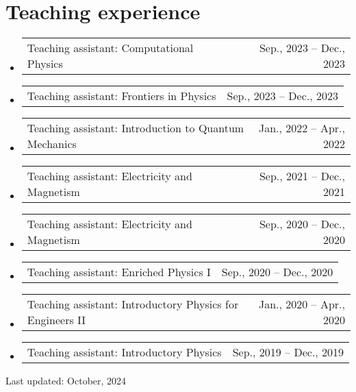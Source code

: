 \documentclass[letterpaper,11pt]{article}
\makeatletter
\newcommand{\TeachingItem}[2]{
	\item{\vspace{-1pt}
		\begin{tabular*}{0.92\textwidth}{l@{\extracolsep{\fill}}r}
			{#1} & {#2}
		\end{tabular*}
		\vspace{-5pt}
	}
}
\makeatother
\begin{document}
\section*{Teaching experience}
\begin{itemize}[leftmargin=*]
	\TeachingItem{Teaching assistant: Computational Physics}{Sep., 2023 -- Dec., 2023}
	\TeachingItem{Teaching assistant: Frontiers in Physics}{Sep., 2023 -- Dec., 2023}
	\TeachingItem{Teaching assistant: Introduction to Quantum Mechanics}{Jan., 2022 -- Apr., 2022}
	\TeachingItem{Teaching assistant: Electricity and Magnetism}{Sep., 2021 -- Dec., 2021}
	\TeachingItem{Teaching assistant: Electricity and Magnetism}{Sep., 2020 -- Dec., 2020}
	\TeachingItem{Teaching assistant: Enriched Physics I}{Sep., 2020 -- Dec., 2020}
	\TeachingItem{Teaching assistant: Introductory Physics for Engineers II}{Jan., 2020 -- Apr., 2020}
	\TeachingItem{Teaching assistant: Introductory Physics}{Sep., 2019 -- Dec., 2019}
\end{itemize}

\vspace{1cm}

\begin{flushright}
	Last updated: October, 2024
\end{flushright}
\end{document}
